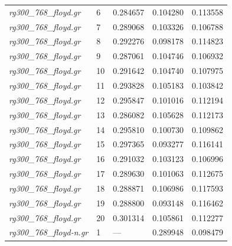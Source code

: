 \documentclass[12pt]{article}
\begin{document}
\begin{longtable}{l|l|lll}
\textit{rg300\_768\_floyd.gr}    &  6        & 0.284657               & 0.104280             & 0.113558                     \\
\textit{rg300\_768\_floyd.gr}    &  7        & 0.289068               & 0.103326             & 0.106788                     \\
\textit{rg300\_768\_floyd.gr}    &  8        & 0.292276               & 0.098178             & 0.114823                     \\
\textit{rg300\_768\_floyd.gr}    &  9        & 0.287061               & 0.104746             & 0.106932                     \\
\textit{rg300\_768\_floyd.gr}    &  10       & 0.291642               & 0.104740             & 0.107975                     \\
\textit{rg300\_768\_floyd.gr}    &  11       & 0.293828               & 0.105183             & 0.103842                     \\
\textit{rg300\_768\_floyd.gr}    &  12       & 0.295847               & 0.101016             & 0.112194                     \\
\textit{rg300\_768\_floyd.gr}    &  13       & 0.286082               & 0.105628             & 0.112173                     \\
\textit{rg300\_768\_floyd.gr}    &  14       & 0.295810               & 0.100730             & 0.109862                     \\
\textit{rg300\_768\_floyd.gr}    &  15       & 0.297365               & 0.093277             & 0.116141                     \\
\textit{rg300\_768\_floyd.gr}    &  16       & 0.291032               & 0.103123             & 0.106996                     \\
\textit{rg300\_768\_floyd.gr}    &  17       & 0.289630               & 0.101063             & 0.112675                     \\
\textit{rg300\_768\_floyd.gr}    &  18       & 0.288871               & 0.106986             & 0.117593                     \\
\textit{rg300\_768\_floyd.gr}    &  19       & 0.288800               & 0.093148             & 0.116462                     \\
\textit{rg300\_768\_floyd.gr}    &  20       & 0.301314               & 0.105861             & 0.112277                     \\ \hline
\textit{rg300\_768\_floyd-n.gr}  &  1        & ---                    & 0.289948             & 0.098479                   \\

\end{longtable}
\end{document}
